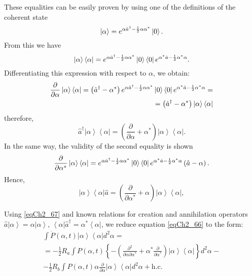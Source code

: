These equalities can be easily proven by using one of the definitions
of the coherent state
\[
\left|\alpha\right> = e^{\alpha \hat{a}^{\dag} -
  \frac{1}{2}\alpha\alpha^{*}} \ket{0}.
\]
From this we have 
\[
\left|\alpha\right>\left<\alpha\right| = e^{\alpha \hat{a}^{\dag} -
  \frac{1}{2}\alpha\alpha^{*}} \ket{0}
\bra{0}e^{\alpha^{*} \hat{a} -
  \frac{1}{2}\alpha^{*}\alpha}.
\]
Differentiating this expression with respect to $\alpha$, we obtain:
\begin{eqnarray}
\frac{\partial}{\partial \alpha}\left|\alpha\right>\left<\alpha\right|
= \left(\hat{a}^{\dag} -
\alpha^{*}\right) e^{\alpha \hat{a}^{\dag} -
  \frac{1}{2}\alpha\alpha^{*}} \ket{0}
\bra{0}e^{\alpha^{*} \hat{a} -
  \frac{1}{2}\alpha^{*}\alpha} = 
\nonumber \\
= \left(\hat{a}^{\dag} -
\alpha^{*}\right)\left|\alpha\right>\left<\alpha\right| 
\nonumber
\end{eqnarray}
therefore,
\begin{equation}
\hat{a}^{\dag}\left|\alpha\right>\left<\alpha\right| = 
\left(\frac{\partial}{\partial \alpha} +
\alpha^{*}\right)\left|\alpha\right>\left<\alpha\right|.
\label{eqCh2_68}
\end{equation}
In the same way, the validity of the second equality is shown
\begin{eqnarray}
\frac{\partial}{\partial \alpha^{*}}\left|\alpha\right>\left<\alpha\right|
=  e^{\alpha \hat{a}^{\dag} -
  \frac{1}{2}\alpha\alpha^{*}} \ket{0}
\bra{0}e^{\alpha^{*} \hat{a} -
  \frac{1}{2}\alpha^{*}\alpha} 
\left(\hat{a} -
\alpha\right). 
\nonumber
\end{eqnarray}
Hence,
\begin{equation}
\left|\alpha\right>\left<\alpha\right|\hat{a} = 
\left(\frac{\partial}{\partial \alpha^{*}} +
\alpha\right)\left|\alpha\right>\left<\alpha\right|, 
\label{eqCh2_68a}
\end{equation}

Using \eqref{eqCh2_67} and known relations for creation and
annihilation operators  $\hat{a}\left|\alpha\right> = \alpha\left|\alpha\right>$,
$\left<\alpha\right|\hat{a}^{\dag} = \alpha^{*}\left<\alpha\right|$,
we reduce equation \eqref{eqCh2_66} to the form:   
\begin{eqnarray}
\int \dot{P}\left(\alpha,
t\right)\left|\alpha\right>\left<\alpha\right| d^2 \alpha  = 
\nonumber \\
= -\frac{1}{2}R_a\int
P\left(\alpha,t\right)
\left\{
-\left(
\frac{\partial^2}{\partial \alpha \partial \alpha^{*}} +
\alpha^{*}\frac{\partial}{\partial \alpha^{*}}
\right)
\left|\alpha\right>\left<\alpha\right| 
\right\}
d^2 \alpha - 
\nonumber \\
-\frac{1}{2}R_b\int P\left(\alpha,t\right)
\alpha \frac{\partial}{\partial \alpha}
\left|\alpha\right>\left<\alpha\right| 
d^2 \alpha + \mbox{h.c.}
\label{eqCh2_69}
\end{eqnarray}

